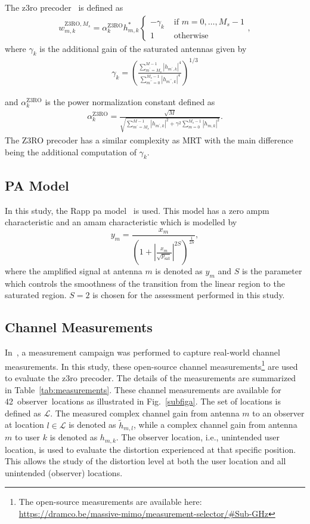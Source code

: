 \documentclass[conference]{IEEEtran}
\newcommand{\update}[1]{{#1}}
\newcommand{\zero}[0]{\gls{z3ro}\xspace}
\newcommand{\zerop}[0]{\zero precoder\xspace}
\newcommand{\pa}[0]{\gls{pa}\xspace}
\begin{document}
The \zerop~\cite{z3ro} is defined as
\begin{align*}
w_{m,k}^{\mathrm{Z} 3 \mathrm{RO}, M_{s}}=\alpha_k^{\mathrm{Z3RO}} h_{m,k}^{*}\left\{\begin{array}{ll}
-\gamma_k & \text { if } m=0, \ldots, M_{s}-1 \\
1 & \text { otherwise }
\end{array},\right.
\end{align*}
where $\gamma_k$ is the additional gain of the saturated antennas given by 
\begin{align*}
\gamma_k=\left(\frac{\sum_{m^{\prime}=M_{s}}^{M-1}\left|h_{m^{\prime},k}\right|^{4}}{\sum_{m^{\prime \prime}=0}^{M_{s}-1}\left|h_{m^{\prime \prime},k}\right|^{4}}\right)^{1 / 3}
\end{align*}

and $\alpha_k^{\mathrm{Z3RO}}$ is the power normalization constant defined as
\begin{align*}
\alpha_k^{\mathrm{Z3RO}}=\frac{\sqrt{M}}{\sqrt{\sum_{m^{\prime}=M_{s}}^{M-1}\left|h_{m^{\prime},k}\right|^{2}+\gamma^{2} \sum_{m=0}^{M_{s}-1}\left|h_{m,k}\right|^{2}}} .
\end{align*}
\update{The Z3RO precoder has a similar complexity as MRT with the main difference being the additional computation of $\gamma_k$. }

\subsection{PA Model}
In this study, the Rapp \pa model~\cite{rapp} is used. This model has a zero \gls{ampm} characteristic and an \gls{amam} characteristic which is modelled by
$$
y_{m}=\frac{x_{m}}{\left(1+\left|\frac{x_{m}}{\sqrt{p_{\mathrm{sat}}}}\right|^{2 S}\right)^{\frac{1}{2 S}}},
$$
where the amplified signal at antenna $m$ is denoted as $y_m$ and $S$ is the parameter which controls the smoothness of the transition from the linear region to the saturated region. $S=2$ is chosen for the assessment performed in this study. 

\subsection{Channel Measurements}
In~\cite{measurements}, a measurement campaign was performed to capture real-world channel measurements. In this study, these open-source channel measurements\footnote{The open-source measurements are available here: \url{https://dramco.be/massive-mimo/measurement-selector/\#Sub-GHz}} are used to evaluate the \zerop. The details of the measurements are summarized in Table~\ref{tab:measurements}. These channel measurements are available for 42~observer~locations as illustrated in Fig.~\ref{subfiga}. The set of locations is defined as $\mathcal{L}$. The measured complex channel gain from antenna $m$ to an observer at location $l \in \mathcal{L}$ is denoted as $\tilde{h}_{m,l}$, while a complex channel gain from antenna $m$ to user $k$ is denoted as $h_{m,k}$. The observer location, i.e., unintended user location, is used to evaluate the distortion experienced at that specific position. This allows the study of the distortion level at both the user location and all unintended (observer) locations. 
\end{document}

